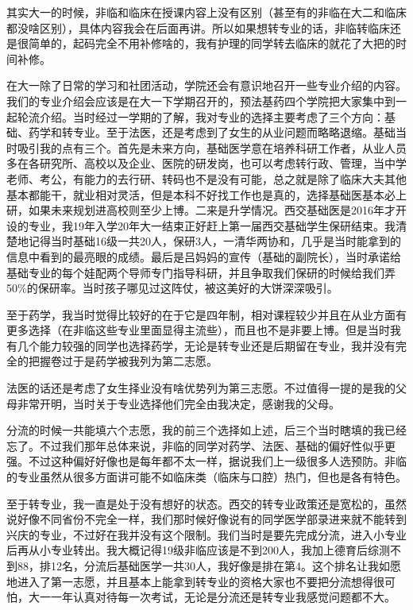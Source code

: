 \documentclass[zihao=-4,fontset=none]{Beautybook-CN}
\begin{document}
其实大一的时候，非临和临床在授课内容上没有区别（甚至有的非临在大二和临床都没啥区别），具体内容我会在后面再讲。所以如果想转专业的话，非临转临床还是很简单的，起码完全不用补修啥的，我有护理的同学转去临床的就花了大把的时间补修。

在大一除了日常的学习和社团活动，学院还会有意识地召开一些专业介绍的内容。我们的专业介绍会应该是在大一下学期召开的，预法基药四个学院把大家集中到一起轮流介绍。当时经过一学期的了解，我对专业的选择主要考虑了三个方向：基础、药学和转专业。至于法医，还是考虑到了女生的从业问题而略略退缩。基础当时吸引我的点有三个。首先是未来方向，基础医学意在培养科研工作者，从业人员多在各研究所、高校以及企业、医院的研发岗，也可以考虑转行政、管理，当中学老师、考公，有能力的去行研、转码也不是没有可能，总之就是除了临床大夫其他基本都能干，就业相对灵活，但是本科不好找工作也是真的，选择基础医基本必上研，如果未来规划进高校则至少上博。二来是升学情况。西交基础医是2016年才开设的专业，我19年入学20年大一结束正好赶上第一届西交基础学生保研结束。我清楚地记得当时基础16级一共20人，保研3人，一清华两协和，几乎是当时能拿到的信息中看到的最亮眼的成绩。最后是吕妈妈的宣传（基础的副院长），当时承诺给基础专业的每个娃配两个导师专门指导科研，并且争取我们保研的时候给我们弄50\%的保研率。当时孩子哪见过这阵仗，被这美好的大饼深深吸引。

至于药学，我当时觉得比较好的在于它是四年制，相对课程较少并且在从业方面有更多选择（在非临这些专业里面显得主流些），而且也不是非要上博。但是当时我有几个能力较强的同学也选择药学，无论是转专业还是后期留在专业，我并没有完全的把握卷过于是药学被我列为第二志愿。

法医的话还是考虑了女生择业没有啥优势列为第三志愿。不过值得一提的是我的父母非常开明，当时关于专业选择他们完全由我决定，感谢我的父母。

分流的时候一共能填六个志愿，我的前三个选择如上述，后三个当时瞎填的我已经忘了。不过我们那年总体来说，非临的同学对药学、法医、基础的偏好性似乎更强。不过这种偏好好像也是每年都不太一样，据说我们上一级很多人选预防。非临的专业虽然从很多方面讲可能不如临床类（临床与口腔）热门，但也是各有特色。

至于转专业，我一直是处于没有想好的状态。西交的转专业政策还是宽松的，虽然说好像不同省份不完全一样，我们那时候好像说有的同学医学部录进来就不能转到兴庆的专业，不过好在我并没有这个限制。我们当时是要先完成分流，进入小专业后再从小专业转出。我大概记得19级非临应该是不到200人，我加上德育后综测不到88，排12名，分流后基础医学一共30人，我好像是排在第4。这个排名让我如愿地进入了第一志愿，并且基本上能拿到转专业的资格\textemdash{}\textemdash{}大家也不要把分流想得很可怕，大一一年认真对待每一次考试，无论是分流还是转专业我感觉问题都不大。
\end{document}
